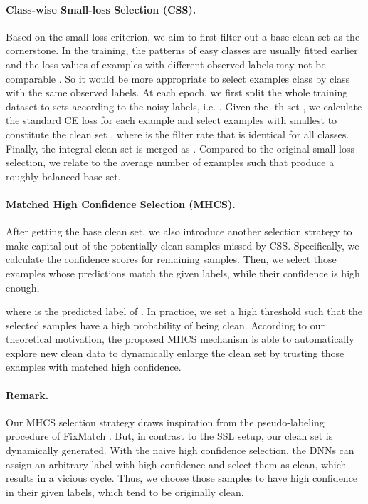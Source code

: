 \documentclass{article}
\begin{document}
\paragraph{Class-wise Small-loss Selection (CSS).}
Based on the small loss criterion, we aim to first filter out a base clean  set as the cornerstone. In the training, the patterns of easy classes are usually fitted earlier and the loss values of examples with different observed labels may not be comparable \cite{DBLP:conf/ijcai/GuiWT21}. So it would be more appropriate to select examples class by class with the same observed labels. At each epoch, we first split the whole training dataset  to  sets according to the noisy labels, i.e. . Given the -th set , we calculate the standard CE loss  for each example and select  examples with smallest  to constitute the clean set , where  is the filter rate that is identical for all classes. Finally, the integral clean set is merged as . Compared to the original small-loss selection, we relate  to the average number of examples  such that produce a roughly balanced base set.


\paragraph{Matched High Confidence Selection (MHCS).}
After getting the base clean set, we also introduce another selection strategy to make capital out of the potentially clean samples missed by CSS. Specifically, we calculate the confidence scores  for remaining samples. Then, we select those examples whose predictions match the given labels, while their confidence is high enough,

where  is the predicted label of . In practice, we set a high threshold  such that the selected samples have a high probability of being clean. According to our theoretical motivation, the proposed MHCS mechanism is able to automatically explore new clean data to dynamically enlarge the clean set  by trusting those examples with matched high confidence.


\paragraph{Remark.} Our MHCS selection strategy draws inspiration from the pseudo-labeling procedure of FixMatch \cite{DBLP:conf/nips/SohnBCZZRCKL20}. But, in contrast to the SSL setup, our clean set is dynamically generated. With the naive high confidence selection, the DNNs can assign an arbitrary label with high confidence and select them as clean, which results in a vicious cycle. Thus, we choose those samples to have high confidence in their given labels, which tend to be originally clean.
\end{document}
